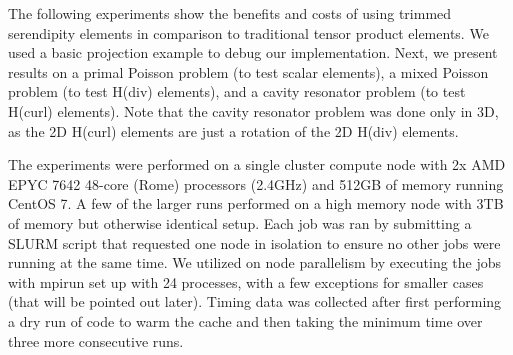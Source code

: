 \documentclass[manuscript,screen]{acmart}
\newcommand\josh[1]{\textbf{\textcolor[rgb]{0,.5,1}{[Josh: #1]}}}
\begin{document}
The following experiments show the benefits and costs of using trimmed serendipity elements in comparison to traditional tensor product elements.  We used a basic projection example to debug our implementation.  Next, we present results on a primal Poisson problem (to test scalar elements), a mixed Poisson problem (to test H(div) elements), and a cavity resonator problem (to test H(curl) elements).  Note that the cavity resonator problem was done only in 3D, as the 2D H(curl) elements are just a rotation of the 2D H(div) elements. 
   
The experiments were performed on a single cluster compute node with 2x AMD EPYC 7642 48-core (Rome) processors (2.4GHz) and 512GB of memory running CentOS 7.  A few of the larger runs performed on a high memory node with 3TB of memory but otherwise identical setup.  Each job was ran by submitting a SLURM script that requested one node in isolation to ensure no other jobs were running at the same time.  We utilized on node parallelism by executing the jobs with mpirun set up with 24 processes, with a few exceptions for smaller cases (that will be pointed out later).  Timing data was collected after first performing a dry run of code to warm the cache and then taking the minimum time over three more consecutive runs.  





\end{document}
